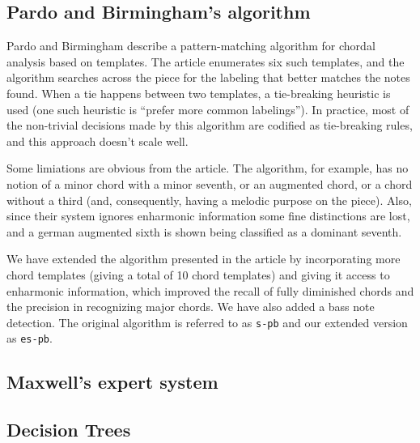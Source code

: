\documentclass{article}
\newcommand{\comment}[1]{}
\begin{document}
\subsection{Pardo and Birmingham's algorithm}
\label{sec:pardo}

\comment{
  ==> algoritmo descrito em \cite{pardo.ea:algorithms}
  ==> baseado em templates e pattern matching
  ==> ignora enarmonia
  ==> feature é um conjunto de pitches
  ==> nossa extensão:
  ===> mais templates
  ===> enarmonia
  ==> regras de desempate: a princípio promissoras, mas a abordagem
  não escala bem
}

Pardo and Birmingham \cite{pardo.ea:algorithms} describe a
pattern-matching algorithm for chordal analysis based on
templates. The article enumerates six such templates, and the
algorithm searches across the piece for the labeling that better
matches the notes found. When a tie happens between two templates, a
tie-breaking heuristic is used (one such heuristic is ``prefer more
common labelings''). In practice, most of the non-trivial decisions
made by this algorithm are codified as tie-breaking rules, and this
approach doesn't scale well.

Some limiations are obvious from the article. The algorithm, for
example, has no notion of a minor chord with a minor seventh, or an
augmented chord, or a chord without a third (and, consequently, having
a melodic purpose on the piece). Also, since their system ignores
enharmonic information some fine distinctions are lost, and a german
augmented sixth is shown being classified as a dominant seventh.

We have extended the algorithm presented in the article by
incorporating more chord templates (giving a total of 10 chord
templates) and giving it access to enharmonic information, which
improved the recall of fully diminished chords and the precision in
recognizing major chords. We have also added a bass note
detection. The original algorithm is referred to as \texttt{s-pb} and
our extended version as \texttt{es-pb}.

\subsection{Maxwell's expert system}
\label{sec:maxwell}


\subsection{Decision Trees}
\label{sec:tree}
\end{document}
